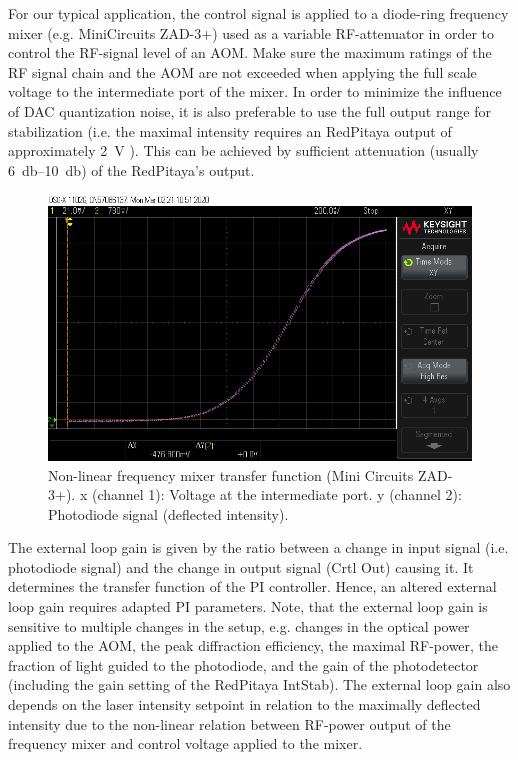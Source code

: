 \documentclass[twoside,a4paper]{refart}
\begin{document}
 
For our typical application, the control signal is applied to a diode-ring frequency mixer (e.g. MiniCircuits ZAD-3+) used as a variable RF-attenuator in order to control the RF-signal level of an AOM. Make sure the maximum ratings of the RF signal chain and the AOM are not exceeded when applying the full scale voltage to the intermediate port of the mixer. In order to minimize the influence of DAC quantization noise, it is also preferable to use the full output range for stabilization (i.e. the maximal intensity requires an RedPitaya output of approximately \SI{2}{\volt} ). This can be achieved by sufficient attenuation (usually \SIrange{6}{10}{\decibel}) of the RedPitaya's output.

\begin{figure}[H]
	\includegraphics[width=\textwidth]{fig/mixer.png}
	\caption{Non-linear frequency mixer transfer function (Mini Circuits ZAD-3+). x (channel 1): Voltage at the intermediate port. y (channel 2): Photodiode signal (deflected intensity).  \label{fig:ZAD3}}
\end{figure} 

 
The external loop gain is given by the ratio between a change in input signal (i.e. photodiode signal) and the change in output signal (Crtl Out) causing it. It determines the transfer function of the PI controller. Hence, an altered external loop gain requires adapted PI parameters. Note, that the external loop gain is sensitive to multiple changes in the setup, e.g. changes in the optical power applied to the AOM, the peak diffraction efficiency, the maximal RF-power,  the fraction of light guided to the photodiode, and the gain of the photodetector (including the gain setting of the RedPitaya IntStab). The external loop gain also depends on the laser intensity setpoint in relation to the maximally deflected intensity due to the non-linear relation between RF-power output of the frequency mixer and control voltage applied to the mixer.
\end{document}
